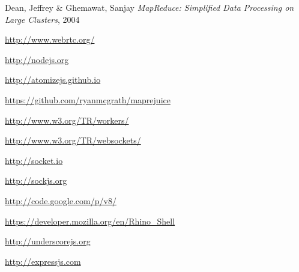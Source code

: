 \begin{thebibliography}{9}

Dean, Jeffrey \& Ghemawat, Sanjay
\emph{MapReduce: Simplified Data Processing on Large Clusters},
2004

\url{http://www.webrtc.org/}

\url{http://nodejs.org}

\url{http://atomizejs.github.io}

\url{https://github.com/ryanmcgrath/maprejuice}

\url{http://www.w3.org/TR/workers/}

\url{http://www.w3.org/TR/websockets/}

\url{http://socket.io}

\url{http://sockjs.org}

\url{http://code.google.com/p/v8/}

\url{https://developer.mozilla.org/en/Rhino_Shell}

\url{http://underscorejs.org}

\url{http://expressjs.com}

\end{thebibliography}